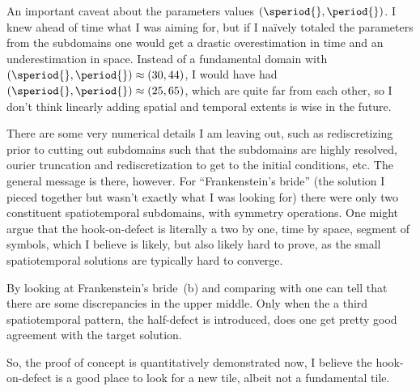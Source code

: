 \begin{description}
{\begin{description}
An important caveat about the parameters values $(\speriod{},\period{})$. I knew
ahead of time what I was aiming for, but if I na\"ively totaled the parameters
from the subdomains one would get a drastic overestimation in time and an
underestimation in space. Instead of a fundamental domain with
$(\speriod{},\period{})\approx (30,44)$, I would have had
$(\speriod{},\period{})\approx(25,65)$, which are quite far from each other, so I
don't think linearly adding spatial and temporal extents is wise in the future.

There are some very numerical details I am leaving out, such as rediscretizing prior to
cutting out subdomains such that the subdomains are highly resolved, ourier truncation and
rediscretization to get to the initial conditions, etc. The general message is there, however.
For ``Frankenstein's bride'' (the solution I pieced together but wasn't exactly what I was looking
for) there were only two constituent spatiotemporal subdomains, with symmetry operations. One
might argue that the hook-on-defect is literally a two by one, time by space, segment of symbols, which
I believe is likely, but also likely hard to prove, as the small spatiotemporal solutions are typically
hard to converge.

By looking at Frankenstein's bride \,(b)
and comparing with
one can tell that there are some discrepancies in the upper middle. Only when the a third spatiotemporal
pattern, the half-defect is introduced, does one get pretty good agreement with the target solution.

So, the proof of concept is quantitatively demonstrated now, I believe the hook-on-defect is a good
place to look for a new tile, albeit not a fundamental tile.


\end{description}}
\end{description}

